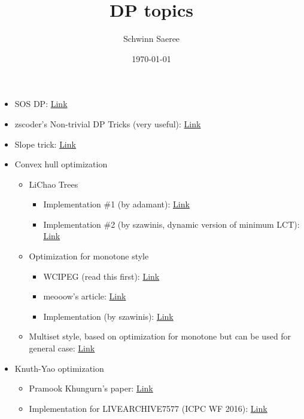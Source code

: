 \documentclass[11pt]{article}
\author{Schwinn Saeree}
\date{\today}
\title{DP topics}
\begin{document}
\maketitle
\tableofcontents

\begin{itemize}
\item SOS DP: \href{https://codeforces.com/blog/entry/45223}{Link}
\item zscoder's Non-trivial DP Tricks (very useful): \href{https://codeforces.com/blog/entry/47764}{Link}
\item Slope trick: \href{https://codeforces.com/blog/entry/47821}{Link}
\item Convex hull optimization
\begin{itemize}
\item LiChao Trees
\begin{itemize}
\item Implementation \#1 (by adamant): \href{https://cp-algorithms.com/geometry/convex\_hull\_trick.html}{Link}
\item Implementation \#2 (by szawinis, dynamic version of minimum LCT): \href{https://codeforces.com/contest/932/submission/51400890}{Link}
\end{itemize}
\item Optimization for monotone style
\begin{itemize}
\item WCIPEG (read this first): \href{https://wcipeg.com/wiki/Convex\_hull\_trick}{Link}
\item meooow's article: \href{https://codeforces.com/blog/entry/63823}{Link}
\item Implementation (by szawinis): \href{https://codeforces.com/contest/319/submission/25433048}{Link}
\end{itemize}
\item Multiset style, based on optimization for monotone but can be used for general case: \href{https://codeforces.com/contest/319/submission/28792061}{Link}
\end{itemize}
\item Knuth-Yao optimization
\begin{itemize}
\item Pramook Khungurn's paper: \href{https://github.com/programming-in-th/tutorial/blob/master/advanced\_topics/Pramook\_2013\_yao-speedup.pdf}{Link}
\item Implementation for LIVEARCHIVE7577 (ICPC WF 2016): \href{https://github.com/szawinis/CompetitiveProgramming/blob/master/LiveArchive/7577.cpp}{Link}

\end{itemize}
\end{itemize}
\end{document}

